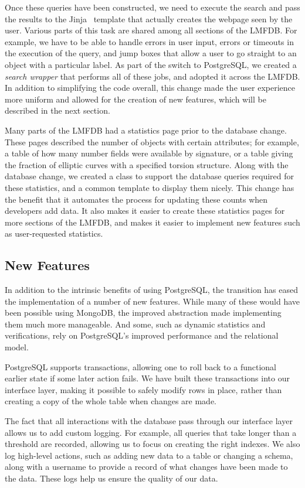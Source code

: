 \documentclass{amsart}
\begin{document}
Once these queries have been constructed, we need to execute the search and pass the results to the Jinja~\cite{jinja} template that actually creates the webpage seen by the user.
Various parts of this task are shared among all sections of the LMFDB.
For example, we have to be able to handle errors in user input, errors or timeouts in the execution of the query, and jump boxes that allow a user to go straight to an object with a particular label.
As part of the switch to PostgreSQL, we created a \emph{search wrapper} that performs all of these jobs, and adopted it across the LMFDB.
In addition to simplifying the code overall, this change made the user experience more uniform and allowed for the creation of new features, which will be described in the next section.

Many parts of the LMFDB had a statistics page prior to the database change.
These pages described the number of objects with certain attributes; for example, a table of how many number fields were available by signature, or a table giving the fraction of elliptic curves with a specified torsion structure.
Along with the database change, we created a class to support the database queries required for these statistics, and a common template to display them nicely.
This change has the benefit that it automates the process for updating these counts when developers add data.
It also makes it easier to create these statistics pages for more sections of the LMFDB, and makes it easier to implement new features such as user-requested statistics.

\subsection{New Features}


In addition to the intrinsic benefits of using PostgreSQL, the transition has eased the implementation of a number of new features.
While many of these would have been possible using MongoDB, the improved abstraction made implementing them much more manageable.
And some, such as dynamic statistics and verifications, rely on PostgreSQL's improved performance and the relational model.

PostgreSQL supports transactions, allowing one to roll back to a functional earlier state if some later action fails.
We have built these transactions into our interface layer, making it possible to safely modify rows in place, rather than creating a copy of the whole table when changes are made.

The fact that all interactions with the database pass through our interface layer allows us to add custom logging.
For example, all queries that take longer than a threshold are recorded, allowing us to focus on creating the right indexes.
We also log high-level actions, such as adding new data to a table or changing a schema, along with a username to provide a record of what changes have been made to the data.
These logs help us ensure the quality of our data.
\end{document}
